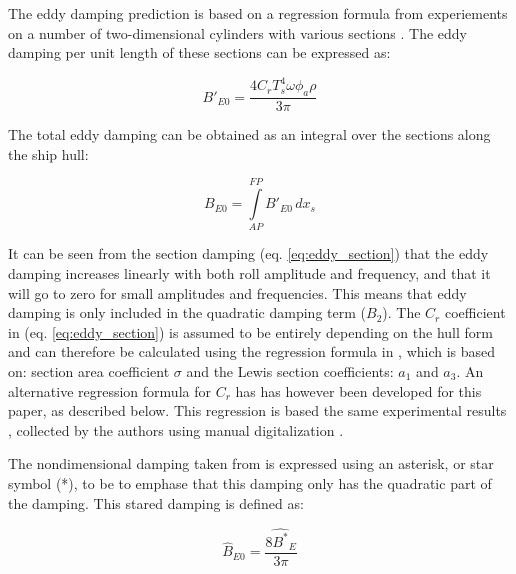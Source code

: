     The eddy damping prediction is based on a regression formula from
experiements on a number of two-dimensional cylinders with various
sections \citep{7505983/4AFVVGNT}. The eddy damping per unit length of
these sections can be expressed as: 
 
            
    
    \begin{equation}
B'_{E0} = \frac{4 C_{r} T_{s}^{4} \omega \phi_{a} \rho}{3 \pi}
\label{eq:eddy_section}
\end{equation}

    

    The total eddy damping can be obtained as an integral over the sections
along the ship hull:
 
            
    
    \begin{equation}
B_{E0} = \int\limits_{AP}^{FP} B'_{E0}\, dx_{s}
\label{eq:eddy_integration}
\end{equation}

    

    It can be seen from the section damping (eq.
\ref{eq:eddy_section}) that the eddy damping increases linearly
with both roll amplitude and frequency, and that it will go to zero for
small amplitudes and frequencies. This means that eddy damping is only
included in the quadratic damping term ($B_2$). The $C_r$
coefficient in (eq. \ref{eq:eddy_section}) is assumed to be
entirely depending on the hull form and can therefore be calculated
using the regression formula in \citep{7505983/4AFVVGNT}, which is based
on: section area coefficient $\sigma$ and the Lewis section
coefficients: $a_1$ and $a_3$. An alternative regression formula for
$C_r$ has has however been developed for this paper, as described
below. This regression is based the same experimental results
\citep{7505983/4AFVVGNT}, collected by the authors using manual
digitalization \citep{7505983/RXYIE6UW}.

    The nondimensional damping taken from \citep{7505983/4AFVVGNT} is
expressed using an asterisk, or star symbol (*), to be to emphase that
this damping only has the quadratic part of the damping. This stared
damping is defined as:
 
            
    
    \begin{equation}
\hat{B}_{E0} = \frac{8 \hat{B^*}_{E}}{3 \pi}
\label{eq:B_E_star_hat}
\end{equation}

    

